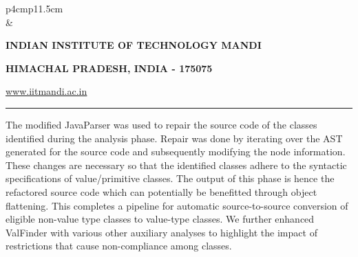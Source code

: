 \documentclass[12 pt, a4paper]{article}
\newcommand{\HRule}{\rule{\linewidth}{1mm}}
\begin{document}
\pagestyle{empty}
\vskip 0.2cm
	\begin{tabular}{p{4cm}p{11.5cm}}
		  \\
		& \centering \large\bf\phantom{Empty line}\\ 
		\rule{0pt}{1pt} \centering \large\bf{INDIAN INSTITUTE OF TECHNOLOGY MANDI} \\
		\rule{0pt}{1pt} \centering \large\bf{HIMACHAL PRADESH, INDIA - 175075} \\
		\rule{0pt}{1pt} \centering \underline{\href{www.iitmandi.ac.in}{www.iitmandi.ac.in}}\\
	\end{tabular}
\noindent

{\raggedleft{}\HRule}

The modified JavaParser was used to repair the source code of the classes identified 
during the analysis phase. 
Repair was done by iterating over the AST generated for the source code and subsequently modifying 
the node information. 
These changes are necessary so that the identified classes adhere to the syntactic specifications of 
value/primitive classes.
The output of this phase is hence the refactored source code which can potentially be benefitted through 
object flattening. This completes a pipeline for automatic source-to-source conversion of eligible non-value type classes 
to value-type classes.
We further enhanced ValFinder with various other auxiliary analyses to highlight the impact of restrictions that
cause non-compliance among classes.
\end{document}

